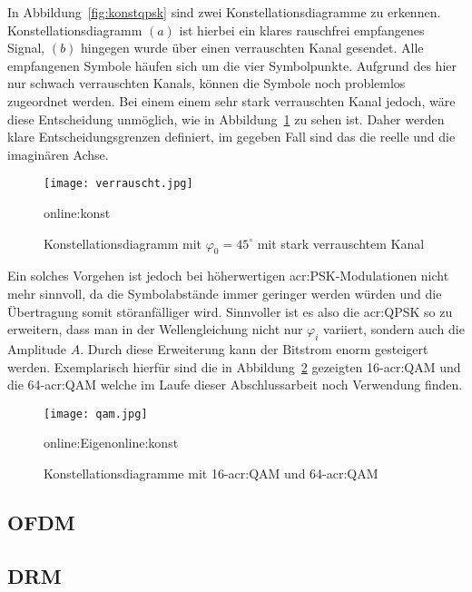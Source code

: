 In Abbildung~\ref{fig:konstqpsk} sind zwei Konstellationsdiagramme zu erkennen. Konstellationsdiagramm $(a)$ ist hierbei ein klares rauschfrei empfangenes Signal, $(b)$ hingegen wurde über einen verrauschten Kanal gesendet. Alle empfangenen Symbole häufen sich um die vier Symbolpunkte. Aufgrund des hier nur schwach verrauschten Kanals, können die Symbole noch problemlos zugeordnet werden. Bei einem einem sehr stark verrauschten Kanal jedoch, wäre diese Entscheidung unmöglich, wie in Abbildung~\ref{fig:verrauscht} zu sehen ist. Daher werden klare Entscheidungsgrenzen definiert, im gegeben Fall sind das die reelle und die imaginären Achse.

\begin{figure}[H]
	\centering
	\texttt{[image: verrauscht.jpg]}
	\caption[Konstellationsdiagramm mit $\varphi_{0}=45^\circ$ mit stark verrauschtem Kanal]{Konstellationsdiagramm mit $\varphi_{0}=45^\circ$ mit stark verrauschtem Kanal} 
	\gls{online:konst}
	\label{fig:verrauscht}
\end{figure}

Ein solches Vorgehen ist jedoch bei höherwertigen \gls{acr:PSK}-Modulationen nicht mehr sinnvoll, da die Symbolabstände immer geringer werden würden und die Übertragung somit störanfälliger wird. Sinnvoller ist es also die \gls{acr:QPSK} so zu erweitern, dass man in der Wellengleichung nicht nur $\varphi_{i}$ variiert, sondern auch die Amplitude $A$. Durch diese Erweiterung kann der Bitstrom enorm gesteigert werden. Exemplarisch hierfür sind die in Abbildung~\ref{fig:qam} gezeigten 16-\gls{acr:QAM} und die 64-\gls{acr:QAM} welche im Laufe dieser Abschlussarbeit noch Verwendung finden. 

\begin{figure}[H]
	\centering
	\texttt{[image: qam.jpg]}
	\caption[Konstellationsdiagramm 16-\gls{acr:QAM} und 64-\gls{acr:QAM}]{Konstellationsdiagramme mit  16-\gls{acr:QAM} und 64-\gls{acr:QAM}} 
	\gls{online:Eigen}\gls{online:konst}
	\label{fig:qam}
\end{figure}

\subsection{OFDM}
\label{subsec:ofdm}



\subsection{DRM}
\label{subsec:drm}



